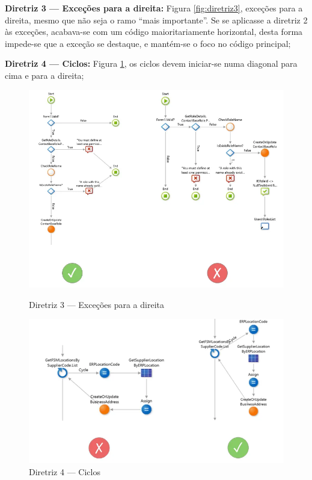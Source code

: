     \textbf{Diretriz 3 — Exceções para a direita:} Figura \ref{fig:diretriz3}, exceções para a direita, mesmo que não seja o ramo ``mais importante''. Se se aplicasse a diretriz 2 às exceções, acabava-se com um código maioritariamente horizontal, desta forma impede-se que a exceção se destaque, e mantém-se o foco no código principal;

    \textbf{Diretriz 4 — Ciclos:} Figura \ref{fig:diretriz4}, os ciclos devem iniciar-se numa diagonal para cima e para a direita;

    \begin{figure}[htbp]
        \centering
        \begin{minipage}{.5\textwidth}
            \centering
            \includegraphics[scale=0.40]{imgs/diretrizes/3.png}
            \caption{Diretriz 3 — Exceções para a direita}\label{fig:diretriz3}
        \end{minipage}%
        \begin{minipage}{.5\textwidth}
            \centering
            \includegraphics[scale=0.32]{imgs/diretrizes/4.png}
            \caption{Diretriz 4 — Ciclos}\label{fig:diretriz4}
        \end{minipage}
    \end{figure}

